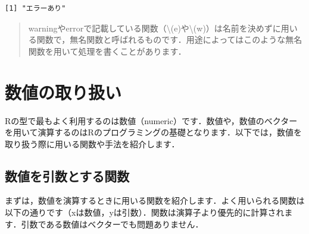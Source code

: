 \documentclass[
  letterpaper,
  DIV=11,
  numbers=noendperiod]{scrreprt}
\begin{document}
\begin{verbatim}
[1] "エラーあり"
\end{verbatim}

\begin{quote}
warningやerrorで記載している関数（\textbackslash(e)や\textbackslash(w)）は名前を決めずに用いる関数で，無名関数と呼ばれるものです．用途によってはこのような無名関数を用いて処理を書くことがあります．
\end{quote}


\hypertarget{ux6570ux5024ux306eux53d6ux308aux6271ux3044}{%
\chapter{数値の取り扱い}\label{ux6570ux5024ux306eux53d6ux308aux6271ux3044}}

Rの型で最もよく利用するのは数値（numeric）です．数値や，数値のベクターを用いて演算するのはRのプログラミングの基礎となります．以下では，数値を取り扱う際に用いる関数や手法を紹介します．

\hypertarget{ux6570ux5024ux3092ux5f15ux6570ux3068ux3059ux308bux95a2ux6570}{%
\section{数値を引数とする関数}\label{ux6570ux5024ux3092ux5f15ux6570ux3068ux3059ux308bux95a2ux6570}}

まずは，数値を演算するときに用いる関数を紹介します．よく用いられる関数は以下の通りです（xは数値，yは引数）．関数は演算子より優先的に計算されます．引数である数値はベクターでも問題ありません．
\end{document}
